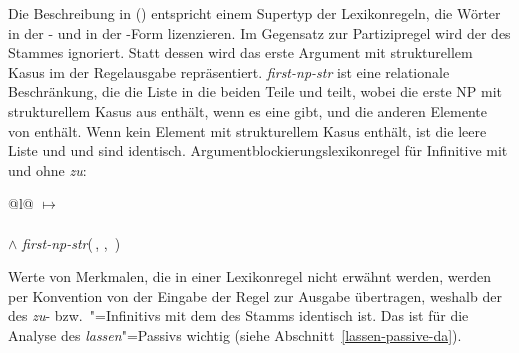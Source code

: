 {%


Die Beschreibung in () entspricht einem Supertyp
der Lexikonregeln, die Wörter in der - und in der -Form
lizenzieren. Im Gegensatz zur Partizipregel wird der \daw des Stammes
ignoriert. Statt dessen wird das erste Argument mit strukturellem
Kasus im \subjw der Regelausgabe repräsentiert.
\textit{first-np-str} ist eine relationale Beschränkung, die die Liste
 in die beiden Teile  und  teilt, wobei 
die erste NP mit strukturellem Kasus aus  enthält, wenn es eine gibt,
und  die anderen Elemente von  enthält. Wenn  
kein Element mit strukturellem Kasus enthält, ist  die leere Liste und 
und  sind identisch.
%
\eas
\label{lr-subj-reduction}
Argumentblockierungslexikonregel für Infinitive mit und ohne \emph{zu}:\\
\begin{tabular}[t]{@{}l@{}}
 $\mapsto$\\
\\$\wedge$ \textit{first-np-str}(\,, , \,)\\
\end{tabular}
\zs
%
Werte von Merkmalen, die in einer Lexikonregel nicht erwähnt werden, werden
per Konvention von der Eingabe der Regel zur Ausgabe übertragen,
weshalb der \daw des \emph{zu}- bzw.\ "=Infinitivs mit dem
\daw des Stamms identisch ist. Das ist für die Analyse des \emph{lassen}"=Passivs
wichtig (siehe Abschnitt~\ref{lassen-passive-da}).

}
